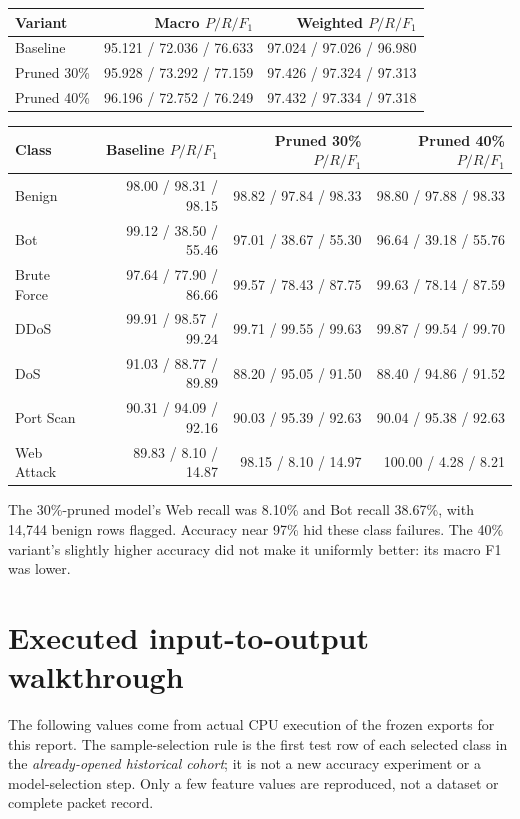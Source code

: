 \documentclass[11pt,a4paper,oneside]{report}
\begin{document}
{\small
\begin{longtable}{@{}lrr@{}}
\toprule
Variant & Macro $P/R/F_1$ & Weighted $P/R/F_1$\\\midrule\endhead
Baseline & 95.121 / 72.036 / 76.633 & 97.024 / 97.026 / 96.980\\
Pruned 30\% & 95.928 / 73.292 / 77.159 & 97.426 / 97.324 / 97.313\\
Pruned 40\% & 96.196 / 72.752 / 76.249 & 97.432 / 97.334 / 97.318\\
\bottomrule\end{longtable}
}



{\small
\begin{longtable}{@{}lrrr@{}}
\toprule
Class & Baseline $P/R/F_1$ & Pruned 30\% $P/R/F_1$ & Pruned 40\% $P/R/F_1$\\\midrule\endhead
Benign & 98.00 / 98.31 / 98.15 & 98.82 / 97.84 / 98.33 & 98.80 / 97.88 / 98.33\\
Bot & 99.12 / 38.50 / 55.46 & 97.01 / 38.67 / 55.30 & 96.64 / 39.18 / 55.76\\
Brute Force & 97.64 / 77.90 / 86.66 & 99.57 / 78.43 / 87.75 & 99.63 / 78.14 / 87.59\\
DDoS & 99.91 / 98.57 / 99.24 & 99.71 / 99.55 / 99.63 & 99.87 / 99.54 / 99.70\\
DoS & 91.03 / 88.77 / 89.89 & 88.20 / 95.05 / 91.50 & 88.40 / 94.86 / 91.52\\
Port Scan & 90.31 / 94.09 / 92.16 & 90.03 / 95.39 / 92.63 & 90.04 / 95.38 / 92.63\\
Web Attack & 89.83 / 8.10 / 14.87 & 98.15 / 8.10 / 14.97 & 100.00 / 4.28 / 8.21\\
\bottomrule\end{longtable}
}

The 30\%-pruned model's Web recall was 8.10\% and Bot recall 38.67\%, with 14,744 benign rows flagged. Accuracy near 97\% hid these class failures. The 40\% variant's slightly higher accuracy did not make it uniformly better: its macro F1 was lower.

\section{Executed input-to-output walkthrough}
The following values come from actual CPU execution of the frozen exports for this report. The sample-selection rule is the first test row of each selected class in the \emph{already-opened historical cohort}; it is not a new accuracy experiment or a model-selection step. Only a few feature values are reproduced, not a dataset or complete packet record.
\end{document}
